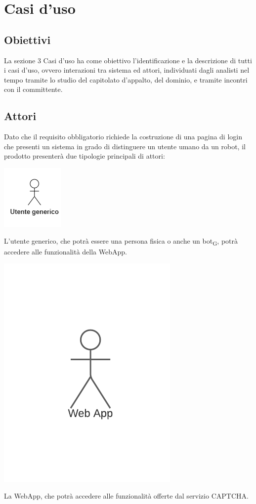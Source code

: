 \section{Casi d'uso}

\subsection{Obiettivi}
La sezione 3 Casi d'uso ha come obiettivo l'identificazione e la descrizione di tutti i casi d'uso, ovvero interazioni tra sistema ed attori, individuati dagli analisti nel tempo tramite lo studio del capitolato d'appalto, del dominio, e tramite incontri con il committente.

\subsection{Attori}
Dato che il requisito obbligatorio richiede la costruzione di una pagina di login che presenti un sistema in grado di distinguere un utente umano da un robot, il prodotto presenterà due tipologie principali di attori:
\begin{center}
\includegraphics[scale = 1]{img/utente_generico.png}\\
\end{center}
L'utente generico, che potrà essere una persona fisica o anche un bot\textsubscript{G}, potrà accedere alle funzionalità della WebApp. \\
\begin{center}
\includegraphics[scale = 1]{img/webapp.png}\\
\end{center}
La WebApp, che potrà accedere alle funzionalità offerte dal servizio CAPTCHA. \\

